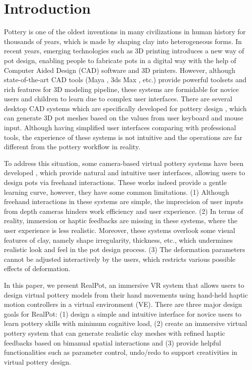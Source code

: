 \documentclass{svjour3}                     %
\begin{document}

\section{Introduction}
\label{sec:1}
Pottery is one of the oldest inventions in many civilizations in human history for thousands of years, which is made by shaping clay into heterogeneous forms.
In recent years, emerging technologies such as 3D printing introduces a new way of pot design, enabling people to fabricate pots in a digital way with the help of Computer Aided Design (CAD) software and 3D printers.
However, although state-of-the-art CAD tools (Maya \cite{website:maya}, 3ds Max \cite{website:3dmax}, etc.) provide powerful toolsets and rich features for 3D modeling pipeline, these systems are formidable for novice users and children to learn due to complex user interfaces.
There are several desktop CAD systems which are specifically developed for pottery design \cite{koutsoudis2009qp,kumar2011wheel}, which can generate 3D pot meshes based on the values from user keyboard and mouse input. Although having simplified user interfaces comparing with professional tools, the experience of these systems is not intuitive and the operations are far different from the pottery workflow in reality.

To address this situation, some camera-based virtual pottery systems have been developed \cite{ramani2015gesture,murugappan2013handy,han2014virtual}, which provide natural and intuitive user interfaces, allowing users to design pots via freehand interactions.
These works indeed provide a gentle learning curve, however, they have some common limitations.
(1) Although freehand interactions in these systems are simple, the imprecision of user inputs from depth cameras hinders work efficiency and user experience.
%
(2) In terms of reality, immersion or haptic feedbacks are missing in these systems, where the user experience is less realistic. Moreover, these systems overlook some visual features of clay, namely shape irregularity, thickness, etc., which undermines realistic look and feel in the pot design process.
%
(3) The deformation parameters cannot be adjusted interactively by the users, which restricts various possible effects of deformation.

In this paper, we present RealPot, an immersive VR system that allows users to design virtual pottery models from their hand movements using hand-held haptic motion controllers in a virtual environment (VE).
There are three major design goals for RealPot:
(1) design a simple and intuitive interface for novice users to learn pottery skills with minimum cognitive load,
(2) create an immersive virtual pottery system that can generate realistic clay meshes with refined haptic feedbacks based on bimanual spatial interactions 
and (3) provide helpful functionalities such as parameter control, undo/redo to support creativities in virtual pottery design.
\end{document}
